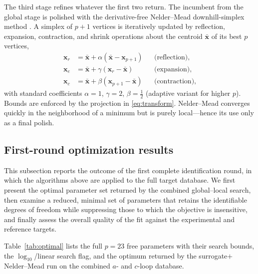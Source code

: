\documentclass{article}
\newcommand{\xv}{\bm{x}}
\begin{document}
The third stage refines whatever the first two return. The incumbent from the
global stage is polished with the derivative-free
Nelder–Mead downhill-simplex method \citep{NelderMead1965}. A simplex of $p+1$
vertices is iteratively updated by reflection, expansion, contraction, and shrink
operations about the centroid $\bar{\xv}$ of its best $p$ vertices,
\begin{align}
  \xv_{r} &= \bar{\xv}+\alpha(\bar{\xv}-\xv_{p+1}) &&\text{(reflection)},\\
  \xv_{e} &= \bar{\xv}+\gamma(\xv_{r}-\bar{\xv})   &&\text{(expansion)},\\
  \xv_{c} &= \bar{\xv}+\beta(\xv_{p+1}-\bar{\xv})  &&\text{(contraction)},
\end{align}
with standard coefficients $\alpha=1$, $\gamma=2$, $\beta=\tfrac12$ (adaptive
variant for higher $p$). Bounds are enforced by the projection in
\eqref{eq:transform}. Nelder–Mead converges quickly in the neighborhood of a
minimum but is purely local—hence its use only as a final polish.

\subsection{First-round optimization results}\label{sec:optresults}
This subsection reports the outcome of the first complete identification round, in which the algorithms above are applied to the full target database. We first present the optimal parameter set returned by the combined global--local search, then examine a reduced, minimal set of parameters that retains the identifiable degrees of freedom while suppressing those to which the objective is insensitive, and finally assess the overall quality of the fit against the experimental and reference targets.

Table~\ref{tab:optimal} lists the full $p=23$ free parameters with their search
bounds, the $\log_{10}$/linear search flag, and the optimum returned by the
surrogate$+$Nelder--Mead run on the combined $a$- and $c$-loop database.
\end{document}
